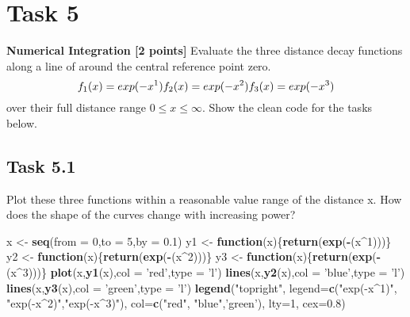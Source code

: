 \documentclass[
]{article}
\newenvironment{Shaded}{\begin{snugshade}}{\end{snugshade}}
\newcommand{\ControlFlowTok}[1]{\textcolor[rgb]{0.13,0.29,0.53}{\textbf{#1}}}
\newcommand{\DataTypeTok}[1]{\textcolor[rgb]{0.13,0.29,0.53}{#1}}
\newcommand{\DecValTok}[1]{\textcolor[rgb]{0.00,0.00,0.81}{#1}}
\newcommand{\FloatTok}[1]{\textcolor[rgb]{0.00,0.00,0.81}{#1}}
\newcommand{\KeywordTok}[1]{\textcolor[rgb]{0.13,0.29,0.53}{\textbf{#1}}}
\newcommand{\NormalTok}[1]{#1}
\newcommand{\OperatorTok}[1]{\textcolor[rgb]{0.81,0.36,0.00}{\textbf{#1}}}
\newcommand{\StringTok}[1]{\textcolor[rgb]{0.31,0.60,0.02}{#1}}
\begin{document}
\hypertarget{task-5}{%
\section{Task 5}\label{task-5}}

\textbf{Numerical Integration {[}2 points{]}} Evaluate the three
distance decay functions along a line of around the central reference
point zero. \[
f_1(x) = exp(-x^1) \\
f_2(x) = exp(-x^2) \\
f_3(x) = exp(-x^3) 
\] over their full distance range \(0≤x≤∞\). Show the clean code for the
tasks below.

\hypertarget{task-5.1}{%
\subsection{Task 5.1}\label{task-5.1}}

Plot these three functions within a reasonable value range of the
distance x. How does the shape of the curves change with increasing
power?

\begin{Shaded}
\begin{Highlighting}[]
\NormalTok{x <-}\StringTok{ }\KeywordTok{seq}\NormalTok{(}\DataTypeTok{from =} \DecValTok{0}\NormalTok{,}\DataTypeTok{to =} \DecValTok{5}\NormalTok{,}\DataTypeTok{by =} \FloatTok{0.1}\NormalTok{)}
\NormalTok{y1 <-}\StringTok{ }\ControlFlowTok{function}\NormalTok{(x)\{}\KeywordTok{return}\NormalTok{(}\KeywordTok{exp}\NormalTok{(}\OperatorTok{-}\NormalTok{(x}\OperatorTok{^}\DecValTok{1}\NormalTok{)))\}}
\NormalTok{y2 <-}\StringTok{ }\ControlFlowTok{function}\NormalTok{(x)\{}\KeywordTok{return}\NormalTok{(}\KeywordTok{exp}\NormalTok{(}\OperatorTok{-}\NormalTok{(x}\OperatorTok{^}\DecValTok{2}\NormalTok{)))\}}
\NormalTok{y3 <-}\StringTok{ }\ControlFlowTok{function}\NormalTok{(x)\{}\KeywordTok{return}\NormalTok{(}\KeywordTok{exp}\NormalTok{(}\OperatorTok{-}\NormalTok{(x}\OperatorTok{^}\DecValTok{3}\NormalTok{)))\}}
\KeywordTok{plot}\NormalTok{(x,}\KeywordTok{y1}\NormalTok{(x),}\DataTypeTok{col =} \StringTok{'red'}\NormalTok{,}\DataTypeTok{type =} \StringTok{'l'}\NormalTok{)}
\KeywordTok{lines}\NormalTok{(x,}\KeywordTok{y2}\NormalTok{(x),}\DataTypeTok{col =} \StringTok{'blue'}\NormalTok{,}\DataTypeTok{type =} \StringTok{'l'}\NormalTok{)}
\KeywordTok{lines}\NormalTok{(x,}\KeywordTok{y3}\NormalTok{(x),}\DataTypeTok{col =} \StringTok{'green'}\NormalTok{,}\DataTypeTok{type =} \StringTok{'l'}\NormalTok{)}
\KeywordTok{legend}\NormalTok{(}\StringTok{"topright"}\NormalTok{, }\DataTypeTok{legend=}\KeywordTok{c}\NormalTok{(}\StringTok{"exp(-x^1)"}\NormalTok{, }\StringTok{"exp(-x^2)"}\NormalTok{,}\StringTok{"exp(-x^3)"}\NormalTok{),}
       \DataTypeTok{col=}\KeywordTok{c}\NormalTok{(}\StringTok{"red"}\NormalTok{, }\StringTok{"blue"}\NormalTok{,}\StringTok{'green'}\NormalTok{), }\DataTypeTok{lty=}\DecValTok{1}\NormalTok{, }\DataTypeTok{cex=}\FloatTok{0.8}\NormalTok{)}
\end{Highlighting}
\end{Shaded}
\end{document}
